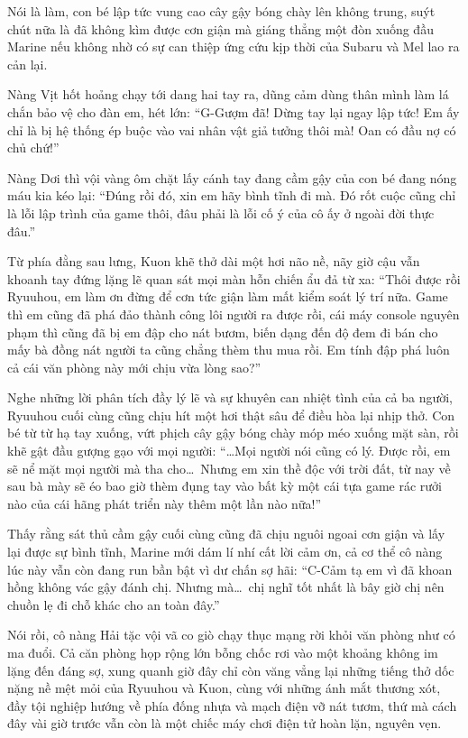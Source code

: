 \documentclass[../main.tex]{subfiles}
\begin{document}
Nói là làm, con bé lập tức vung cao cây gậy bóng chày lên không trung, suýt chút nữa là đã không kìm được cơn giận mà giáng thẳng một đòn xuống đầu Marine nếu không nhờ có sự can thiệp ứng cứu kịp thời của Subaru và Mel lao ra cản lại.

Nàng Vịt hốt hoảng chạy tới dang hai tay ra, dũng cảm dùng thân mình làm lá chắn bảo vệ cho đàn em, hét lớn: ``G-Gượm đã! Dừng tay lại ngay lập tức! Em ấy chỉ là bị hệ thống ép buộc vào vai nhân vật giả tưởng thôi mà! Oan có đầu nợ có chủ chứ!''

Nàng Dơi thì vội vàng ôm chặt lấy cánh tay đang cầm gậy của con bé đang nóng máu kia kéo lại: ``Đúng rồi đó, xin em hãy bình tĩnh đi mà. Đó rốt cuộc cũng chỉ là lỗi lập trình của game thôi, đâu phải là lỗi cố ý của cô ấy ở ngoài đời thực đâu.''

Từ phía đằng sau lưng, Kuon khẽ thở dài một hơi não nề, nãy giờ cậu vẫn khoanh tay đứng lặng lẽ quan sát mọi màn hỗn chiến ẩu đả từ xa: ``Thôi được rồi Ryuuhou, em làm ơn đừng để cơn tức giận làm mất kiểm soát lý trí nữa. Game thì em cũng đã phá đảo thành công lôi người ra được rồi, cái máy console nguyên phạm thì cũng đã bị em đập cho nát bươm, biến dạng đến độ đem đi bán cho mấy bà đồng nát người ta cũng chẳng thèm thu mua rồi. Em tính đập phá luôn cả cái văn phòng này mới chịu vừa lòng sao?''

Nghe những lời phân tích đầy lý lẽ và sự khuyên can nhiệt tình của cả ba người, Ryuuhou cuối cùng cũng chịu hít một hơi thật sâu để điều hòa lại nhịp thở. Con bé từ từ hạ tay xuống, vứt phịch cây gậy bóng chày móp méo xuống mặt sàn, rồi khẽ gật đầu gượng gạo với mọi người: ``\dots Mọi người nói cũng có lý. Được rồi, em sẽ nể mặt mọi người mà tha cho\dots\ Nhưng em xin thề độc với trời đất, từ nay về sau bà mày sẽ éo bao giờ thèm đụng tay vào bất kỳ một cái tựa game rác rưởi nào của cái hãng phát triển này thêm một lần nào nữa!''

Thấy rằng sát thủ cầm gậy cuối cùng cũng đã chịu nguôi ngoai cơn giận và lấy lại được sự bình tĩnh, Marine mới dám lí nhí cất lời cảm ơn, cả cơ thể cô nàng lúc này vẫn còn đang run bần bật vì dư chấn sợ hãi: ``C-Cảm tạ em vì đã khoan hồng không vác gậy đánh chị. Nhưng mà\dots\ chị nghĩ tốt nhất là bây giờ chị nên chuồn lẹ đi chỗ khác cho an toàn đây.''

Nói rồi, cô nàng Hải tặc vội vã co giò chạy thục mạng rời khỏi văn phòng như có ma đuổi. Cả căn phòng họp rộng lớn bỗng chốc rơi vào một khoảng không im lặng đến đáng sợ, xung quanh giờ đây chỉ còn văng vẳng lại những tiếng thở dốc nặng nề mệt mỏi của Ryuuhou và Kuon, cùng với những ánh mắt thương xót, đầy tội nghiệp hướng về phía đống nhựa và mạch điện vỡ nát tươm, thứ mà cách đây vài giờ trước vẫn còn là một chiếc máy chơi điện tử hoàn lặn, nguyên vẹn.
\end{document}
